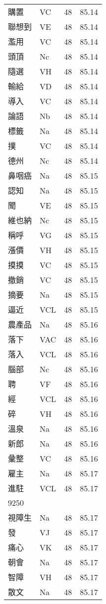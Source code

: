 \documentclass[twocolumn]{book}
\begin{document}
\begin{supertabular}{llrr}
購置 & VC & 48 &  85.14\\
聯想到 & VE & 48 &  85.14\\
濫用 & VC & 48 &  85.14\\
頭頂 & Nc & 48 &  85.14\\
隨選 & VH & 48 &  85.14\\
輸給 & VD & 48 &  85.14\\
導入 & VC & 48 &  85.14\\
論語 & Nb & 48 &  85.14\\
標籤 & Na & 48 &  85.14\\
撲 & VC & 48 &  85.14\\
德州 & Nc & 48 &  85.14\\
鼻咽癌 & Na & 48 &  85.15\\
認知 & Na & 48 &  85.15\\
聞 & VE & 48 &  85.15\\
維也納 & Nc & 48 &  85.15\\
稱呼 & VG & 48 &  85.15\\
漲價 & VH & 48 &  85.15\\
摸摸 & VC & 48 &  85.15\\
撤銷 & VC & 48 &  85.15\\
摘要 & Na & 48 &  85.15\\
逼近 & VCL & 48 &  85.15\\
農產品 & Na & 48 &  85.16\\
落下 & VAC & 48 &  85.16\\
落入 & VCL & 48 &  85.16\\
腦部 & Nc & 48 &  85.16\\
聘 & VF & 48 &  85.16\\
經 & VCL & 48 &  85.16\\
碎 & VH & 48 &  85.16\\
溫泉 & Na & 48 &  85.16\\
新郎 & Na & 48 &  85.16\\
彙整 & VC & 48 &  85.16\\
雇主 & Na & 48 &  85.17\\
進駐 & VCL & 48 &  85.17\\
9250\\
視障生 & Na & 48 &  85.17\\
發 & VJ & 48 &  85.17\\
痛心 & VK & 48 &  85.17\\
朝會 & Na & 48 &  85.17\\
智障 & VH & 48 &  85.17\\
散文 & Na & 48 &  85.17\\

\end{supertabular}
\end{document}
